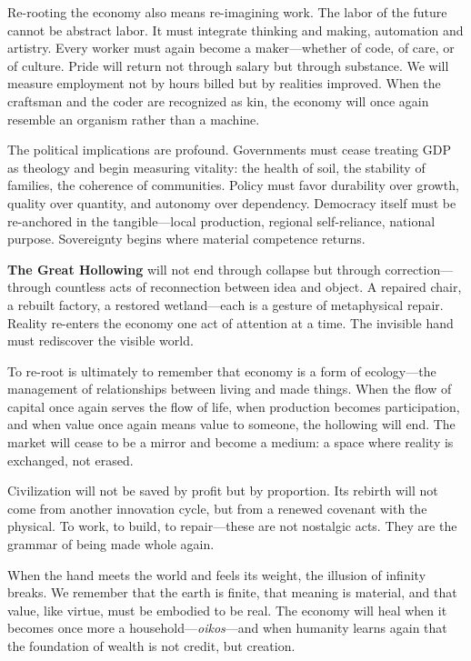 \documentclass[11pt,twoside]{book}
\begin{document}
\bigskip

Re-rooting the economy also means re-imagining work.  
The labor of the future cannot be abstract labor.  
It must integrate thinking and making, automation and artistry.  
Every worker must again become a maker—whether of code, of care, or of culture.  
Pride will return not through salary but through substance.  
We will measure employment not by hours billed but by realities improved.  
When the craftsman and the coder are recognized as kin, the economy will once again resemble an organism rather than a machine.

The political implications are profound.  
Governments must cease treating GDP as theology and begin measuring vitality: the health of soil, the stability of families, the coherence of communities.  
Policy must favor durability over growth, quality over quantity, and autonomy over dependency.  
Democracy itself must be re-anchored in the tangible—local production, regional self-reliance, national purpose.  
Sovereignty begins where material competence returns.

\textbf{The Great Hollowing} will not end through collapse but through correction—through countless acts of reconnection between idea and object.  
A repaired chair, a rebuilt factory, a restored wetland—each is a gesture of metaphysical repair.  
Reality re-enters the economy one act of attention at a time.  
The invisible hand must rediscover the visible world.

\bigskip

To re-root is ultimately to remember that economy is a form of ecology—the management of relationships between living and made things.  
When the flow of capital once again serves the flow of life, when production becomes participation, and when value once again means value to someone, the hollowing will end.  
The market will cease to be a mirror and become a medium: a space where reality is exchanged, not erased.

Civilization will not be saved by profit but by proportion.  
Its rebirth will not come from another innovation cycle, but from a renewed covenant with the physical.  
To work, to build, to repair—these are not nostalgic acts.  
They are the grammar of being made whole again.

When the hand meets the world and feels its weight, the illusion of infinity breaks.  
We remember that the earth is finite, that meaning is material, and that value, like virtue, must be embodied to be real.  
The economy will heal when it becomes once more a household—\textit{oikos}—and when humanity learns again that the foundation of wealth is not credit, but creation.
\end{document}
